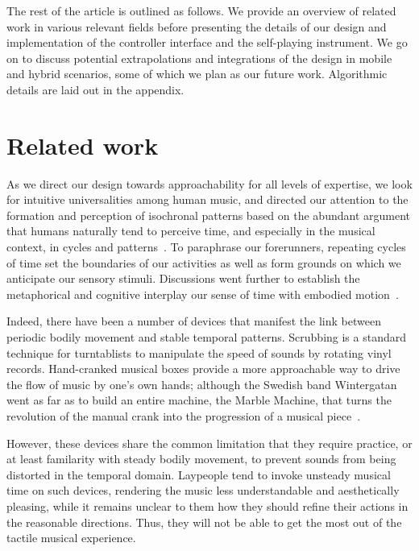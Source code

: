 \documentclass{nime-alternate} %
\begin{document}
The rest of the article is outlined as follows. We provide an overview of related work in various relevant fields before presenting the details of our design and implementation of the controller interface and the self-playing instrument. We go on to discuss potential extrapolations and integrations of the design in mobile and hybrid scenarios, some of which we plan as our future work. Algorithmic details are laid out in the appendix.

\section{Related work}

As we direct our design towards approachability for all levels of expertise, we look for intuitive universalities among human music, and directed our attention to the formation and perception of isochronal patterns based on the abundant argument that humans naturally tend to perceive time, and especially in the musical context, in cycles and patterns~\cite{Brower:Cog, Neisser_1976, Ravignani2016}. To paraphrase our forerunners, repeating cycles of time set the boundaries of our activities as well as form grounds on which we anticipate our sensory stimuli. Discussions went further to establish the metaphorical and cognitive interplay our sense of time with embodied motion~\cite{Johnson_Larson_2003, Johnson_2008}.

Indeed, there have been a number of devices that manifest the link between periodic bodily movement and stable temporal patterns. Scrubbing is a standard technique for turntablists to manipulate the speed of sounds by rotating vinyl records. Hand-cranked musical boxes provide a more approachable way to drive the flow of music by one's own hands; although the Swedish band Wintergatan went as far as to build an entire machine, the Marble Machine, that turns the revolution of the manual crank into the progression of a musical piece~\cite{Rundle_Woollaston-Webber_2017}.

However, these devices share the common limitation that they require practice, or at least familarity with steady bodily movement, to prevent sounds from being distorted in the temporal domain. Laypeople tend to invoke unsteady musical time on such devices, rendering the music less understandable and aesthetically pleasing, while it remains unclear to them how they should refine their actions in the reasonable directions. Thus, they will not be able to get the most out of the tactile musical experience.
\end{document}
